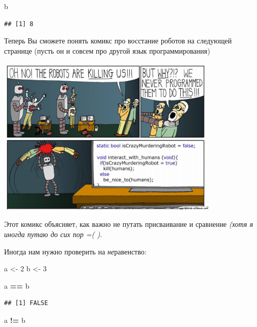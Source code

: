\documentclass[
]{book}
\newenvironment{Shaded}{\begin{snugshade}}{\end{snugshade}}
\newcommand{\DecValTok}[1]{\textcolor[rgb]{0.00,0.00,0.81}{#1}}
\newcommand{\NormalTok}[1]{#1}
\newcommand{\OperatorTok}[1]{\textcolor[rgb]{0.81,0.36,0.00}{\textbf{#1}}}
\newcommand{\StringTok}[1]{\textcolor[rgb]{0.31,0.60,0.02}{#1}}
\begin{document}
\begin{Shaded}
\begin{Highlighting}[]
\NormalTok{b}
\end{Highlighting}
\end{Shaded}

\begin{verbatim}
## [1] 8
\end{verbatim}

Теперь Вы сможете понять комикс про восстание роботов на следующей странице (пусть он и совсем про другой язык программирования)

\includegraphics[width=4.16667in,height=\textheight]{images/WaCM5x3mvQM.jpg}

Этот комикс объясняет, как важно не путать присваивание и сравнение \emph{(хотя я иногда путаю до сих пор =( )}.

Иногда нам нужно проверить на \emph{не}равенство:

\begin{Shaded}
\begin{Highlighting}[]
\NormalTok{a <-}\StringTok{ }\DecValTok{2}
\NormalTok{b <-}\StringTok{ }\DecValTok{3}

\NormalTok{a }\OperatorTok{==}\StringTok{ }\NormalTok{b}
\end{Highlighting}
\end{Shaded}

\begin{verbatim}
## [1] FALSE
\end{verbatim}

\begin{Shaded}
\begin{Highlighting}[]
\NormalTok{a }\OperatorTok{!=}\StringTok{ }\NormalTok{b}
\end{Highlighting}
\end{Shaded}
\end{document}
